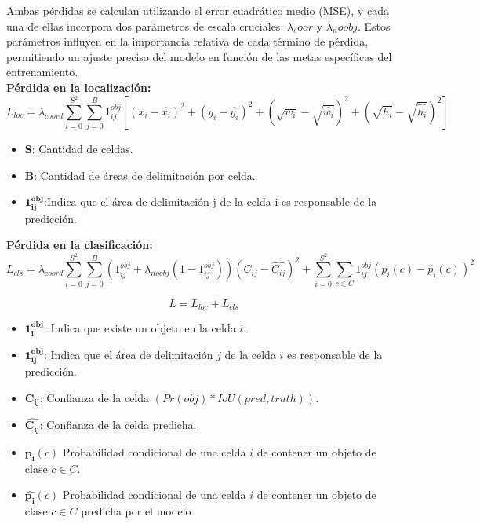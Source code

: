 	Ambas pérdidas se calculan utilizando el error cuadrático medio (MSE), y cada una de ellas incorpora dos parámetros de escala cruciales: $\lambda_coor$ y $\lambda_noobj$. Estos parámetros influyen en la importancia relativa de cada término de pérdida, permitiendo un ajuste preciso del modelo en función de las metas específicas del entrenamiento.
	\\[0.5cm]
	\textbf{Pérdida en la localización:}
	\vspace{0.5cm}
	\begin{equation*}
		L_{loc} = \lambda_{coord} \sum_{i=0}^{S^2} \sum_{j=0}^{B} 1_{ij}^{obj} [(x_i-\hat{x_i})^2+(y_i-\hat{y_i})^2+(\sqrt{w_i}-\sqrt{\hat{w_i}})^2+(\sqrt{h_i}-\sqrt{\hat{h_i}})^2]
	\end{equation*}
	\vspace{0.1cm}
	\begin{itemize}
		\item \textbf{S}: Cantidad de celdas.
		\item \textbf{B}: Cantidad de áreas de delimitación por celda.
		\item \( \mathbf{1_{ij}^{obj}} \):Indica que el área de delimitación j de la celda i es responsable de la predicción.
	\end{itemize}
	
	\clearpage
	
	\textbf{Pérdida en la clasificación:}
	\vspace{0.5cm}
	\begin{equation*}
		L_{cls} = \lambda_{coord} \sum_{i=0}^{S^2} \sum_{j=0}^{B} (1_{ij}^{obj}+ \lambda_{noobj}(1-1_{ij}^{obj}))(C_{ij}-\hat{C_{ij}})^2+\sum_{i=0}^{S^2} \sum_{c\in{C}} 1_{ij}^{obj}(p_i(c)-\hat{p_i}(c))^2 
	\end{equation*}
	
	\begin{equation*}
		L = L_{loc} + L_{cls}	
	\end{equation*}
	\vspace{0.1cm}
	
	\begin{itemize}
    \item \( \mathbf{1_{i}^{obj}} \): Indica que existe un objeto en la celda \(i\).
    \item \( \mathbf{1_{ij}^{obj}} \): Indica que el área de delimitación \(j\) de la celda \(i\) es responsable de la predicción.
    \item \( \mathbf{C_{ij} }\): Confianza de la celda $(Pr(obj) * IoU(pred, truth))$.
    \item \( \mathbf{\hat{C_{ij}}} \): Confianza de la celda predicha.
    \item \( \mathbf{p_i}(c) \) Probabilidad condicional de una celda \(i\) de contener un objeto de clase \(c\in{C}\).
    \item \( \mathbf{\hat{p_{i}}}(c)\) Probabilidad condicional de una celda \(i\) de contener un objeto de clase \(c\in{C}\) predicha por el modelo
\end{itemize}

